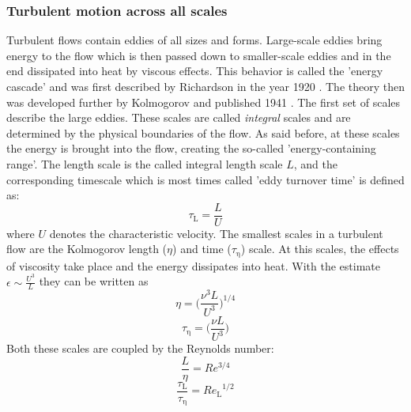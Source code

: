 \documentclass[11pt,a4paper,openany,oneside,parskip=half*]{article}
\begin{document}
\subsubsection{Turbulent motion across all scales}
Turbulent flows contain eddies of all sizes and forms. Large-scale eddies bring energy to the flow which is then passed down to smaller-scale eddies and in the end dissipated into heat by viscous effects. This behavior is called the 'energy cascade' and was first described by Richardson in the year 1920 \cite{Richardson1920}. The theory then was developed further by Kolmogorov and published 1941 \cite{Kolmogorov1941}.
\newline
The first set of scales describe the large eddies. These scales are called \textit{integral} scales and are determined by the physical boundaries of the flow. As said before, at these scales the energy is brought into the flow, creating the so-called 'energy-containing range'. The length scale is the called integral length scale $L$, and the corresponding timescale which is most times called 'eddy turnover time' is defined as:
\begin{equation}
\tau_\mathrm{L} = \frac{L}{U}
\end{equation}
where $U$ denotes the characteristic velocity.
\newline
The smallest scales in a turbulent flow are the Kolmogorov length ($\eta$) and time ($\tau_\mathrm{\eta}$) scale. At this scales, the effects of viscosity take place and the energy dissipates into heat. With the estimate $\epsilon \sim \frac{U^3}{L} $ they can be written as
\begin{equation}
\eta = \biggl (\frac{\nu^3 L}{U^3} \biggl )^{1/4}
\end{equation}
\begin{equation}
\tau_\mathrm{\eta} = \biggl (\frac{\nu L}{U^3} \biggl )
\end{equation}
Both these scales are coupled by the Reynolds number:
\begin{equation}
\frac{L}{\eta} = Re^{3/4}
\end{equation}
\begin{equation}
\frac{\tau_\mathrm{L}}{\tau_\mathrm{\eta}} = {Re_\mathrm{L}}^{1/2}
\end{equation}
\end{document}
